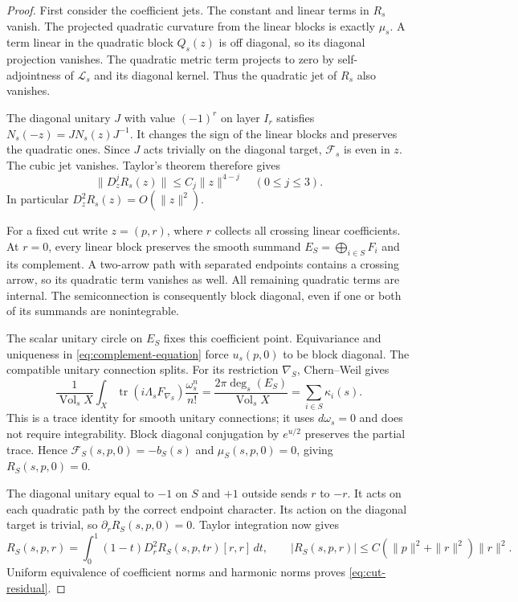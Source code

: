 \documentclass[11pt]{amsart}
\theoremstyle{definition}
\theoremstyle{remark}
\newcommand{\tr}{\operatorname{tr}}
\newcommand{\Vol}{\operatorname{Vol}}
\newcommand{\cF}{\mathcal F}
\begin{document}
\begin{proof}
First consider the coefficient jets. The constant and linear terms in
$R_s$ vanish. The projected quadratic curvature from the linear blocks is
exactly $\mu_s$. A term linear in the quadratic block $Q_s(z)$ is off
diagonal, so its diagonal projection vanishes. The quadratic metric term
projects to zero by self-adjointness of $\mathcal L_s$ and its diagonal
kernel. Thus the quadratic jet of $R_s$ also vanishes.

The diagonal unitary $J$ with value $(-1)^r$ on layer $I_r$ satisfies
$N_s(-z)=JN_s(z)J^{-1}$. It changes the sign of the linear blocks and
preserves the quadratic ones. Since $J$ acts trivially on the diagonal
target, $\cF_s$ is even in $z$. The cubic jet vanishes. Taylor's theorem
therefore gives
\begin{equation}\label{eq:residual-jets}
 \|D_z^jR_s(z)\|\le C_j\|z\|^{4-j}\quad(0\le j\le3).
\end{equation}
In particular $D_z^2R_s(z)=O(\|z\|^2)$.

For a fixed cut write $z=(p,r)$, where $r$ collects all crossing linear
coefficients. At $r=0$, every linear block preserves the smooth summand
$E_S=\bigoplus_{i\in S}F_i$ and its complement. A two-arrow path with
separated endpoints contains a crossing arrow, so its quadratic term
vanishes as well. All remaining quadratic terms are internal. The
semiconnection is consequently block diagonal, even if one or both of its
summands are nonintegrable.

The scalar unitary circle on $E_S$ fixes this coefficient point.
Equivariance and uniqueness in \eqref{eq:complement-equation} force
$u_s(p,0)$ to be block diagonal. The compatible unitary connection splits.
For its restriction $\nabla_S$, Chern--Weil gives
\begin{equation}\label{eq:partial-chern-weil}
 \frac1{\Vol_sX}\int_X\tr(i\Lambda_sF_{\nabla_S})
                   \frac{\omega_s^n}{n!}
 =\frac{2\pi\deg_s(E_S)}{\Vol_sX}
 =\sum_{i\in S}\kappa_i(s).
\end{equation}
This is a trace identity for smooth unitary connections; it uses
$d\omega_s=0$ and does not require integrability. Block diagonal
conjugation by $e^{u/2}$ preserves the partial trace. Hence
$\cF_S(s,p,0)=-b_S(s)$ and $\mu_S(s,p,0)=0$, giving
$R_S(s,p,0)=0$.

The diagonal unitary equal to $-1$ on $S$ and $+1$ outside sends
$r$ to $-r$. It acts on each quadratic path by the correct endpoint
character. Its action on the diagonal target is trivial, so
$\partial_rR_S(s,p,0)=0$. Taylor integration now gives
\[
 R_S(s,p,r)=\int_0^1(1-t)D_r^2R_S(s,p,tr)[r,r]\,dt,
 \qquad |R_S(s,p,r)|\le C(\|p\|^2+\|r\|^2)\|r\|^2.
\]
Uniform equivalence of coefficient norms and harmonic norms proves
\eqref{eq:cut-residual}.
\end{proof}
\end{document}
